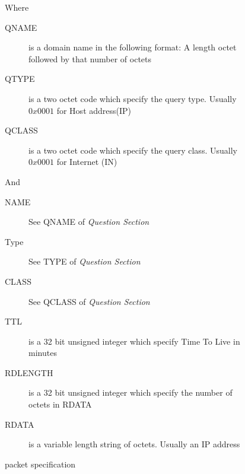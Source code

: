 \documentclass{article}
\begin{document}
\begin{figure}[H]
    \ContinuedFloat
	Where
	\begin{description}
		\item[QNAME] is a domain name in the following format: A length octet followed by that number of octets
		\item[QTYPE] is a two octet code which specify the query type. Usually $0x0001$ for Host address(IP)
		\item[QCLASS] is a two octet code which specify the query class. Usually $0x0001$ for Internet (IN)
	\end{description}
	And
	\begin{description}
		\item[NAME] See QNAME of \emph{Question Section}
		\item[Type] See TYPE of \emph{Question Section}
		\item[CLASS] See QCLASS of \emph{Question Section}
		\item[TTL] is a 32 bit unsigned integer which specify Time To Live in minutes
		\item[RDLENGTH] is a 32 bit unsigned integer which specify the number of octets in RDATA
		\item[RDATA] is a variable length string of octets. Usually an IP address
	\end{description}

	\caption{ packet specification\cite{url:rfc:llmnr}\cite{url:rfc:dns}}
	\label{fig:llmnr-packet}
\end{figure}
\end{document}
